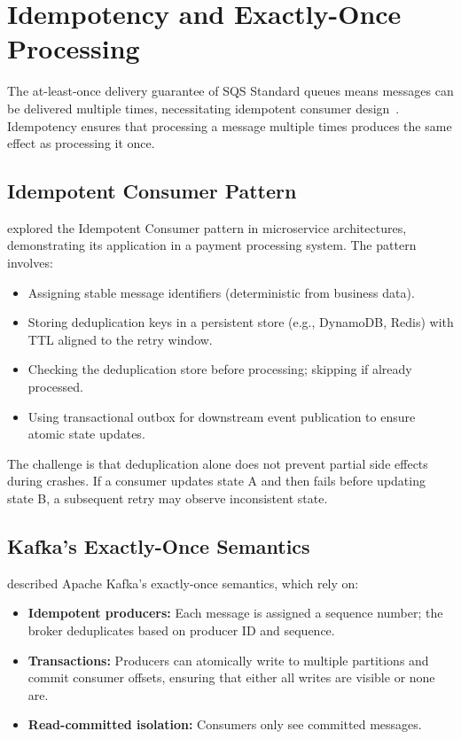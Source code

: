 \section{Idempotency and Exactly-Once Processing}

The at-least-once delivery guarantee of SQS Standard queues means messages can be delivered multiple times, necessitating idempotent consumer design~\citep{Yadav2024Idempotent}. Idempotency ensures that processing a message multiple times produces the same effect as processing it once.

\subsection{Idempotent Consumer Pattern}

\citet{Yadav2024Idempotent} explored the Idempotent Consumer pattern in microservice architectures, demonstrating its application in a payment processing system. The pattern involves:
\begin{itemize}
    \item Assigning stable message identifiers (deterministic from business data).
    \item Storing deduplication keys in a persistent store (e.g., DynamoDB, Redis) with TTL aligned to the retry window.
    \item Checking the deduplication store before processing; skipping if already processed.
    \item Using transactional outbox for downstream event publication to ensure atomic state updates.
\end{itemize}

The challenge is that deduplication alone does not prevent partial side effects during crashes. If a consumer updates state A and then fails before updating state B, a subsequent retry may observe inconsistent state.

\subsection{Kafka's Exactly-Once Semantics}

\citet{Wang2021KafkaExactlyOnce} described Apache Kafka's exactly-once semantics, which rely on:
\begin{itemize}
    \item \textbf{Idempotent producers:} Each message is assigned a sequence number; the broker deduplicates based on producer ID and sequence.
    \item \textbf{Transactions:} Producers can atomically write to multiple partitions and commit consumer offsets, ensuring that either all writes are visible or none are.
    \item \textbf{Read-committed isolation:} Consumers only see committed messages.
\end{itemize}

